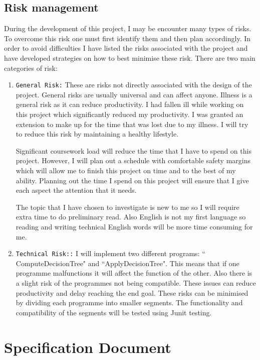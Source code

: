 \documentclass{report}
\begin{document}
\section{Risk management}
\label{sec:riskman}

During the development of this project, I may be encounter many types of risks. To overcome this risk one must first identify them and then plan accordingly.
In order to avoid difficulties I have listed the risks associated with the project and have developed strategies on how to best minimise these risk.
There are two main categories of risk:
\begin{enumerate}

\item \texttt{General Risk:} These are risks not directly associated with the design of the project. General risks are usually universal and can affect anyone. Illness is a general risk as it can reduce productivity. I had fallen ill while working on this project which significantly reduced my productivity. I was granted an extension to make up for the time that was lost due to my illness. I will try to reduce this risk by maintaining a healthy lifestyle.
 
Significant coursework load will reduce the time that I have to spend on this project. However, I will plan out a schedule with comfortable safety margins which will allow me to finish this project on time and to the best of my ability. Planning out the time I spend on this project will ensure that I give each aspect the attention that it needs.

The topic that I have chosen to investigate is new to me so I will require extra time to do preliminary read. Also English is not my first language so reading and writing technical English words will be more time consuming for me.
 
\item \texttt{Technical Risk::} I will implement two different programs: `` ComputeDecisionTree" and
``ApplyDecisionTree". This means that if one programme malfunctions it will affect the function of the other. Also there is a slight risk of the programmes not being compatible. These issues can reduce productivity and delay reaching the end goal. These risks can be minimised by dividing each programme into smaller segments. The functionality and compatibility of the segments will be tested using Junit testing.

\end{enumerate}


\chapter{Specification Document}
\label{cha:specdoc}
\end{document}
